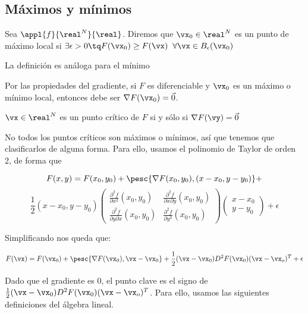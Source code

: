 \documentclass[12pt,a4paper,titlepage]{apuntes}
\begin{document}
\subsection{Máximos y mínimos}

\begin{defn} Sea $\appl{f}{\real^N}{\real}$. Diremos que $\vx_0 \in \real^N$ es un punto de máximo local si $\exists \epsilon > 0 \tq F(\vx_0) \geq F(\vx)\;\; \forall \vx \in B_{\epsilon} (\vx_0) $

La definición es análoga para el mínimo\end{defn}

\begin{remark} Por las propiedades del gradiente, si $F$ es diferenciable y $\vx_0$ es un máximo o mínimo local, entonces debe ser $\nabla F(\vx_0) = \vec{0}$.\end{remark}

\begin{defn} $\vx \in \real^N$ es un punto crítico de $F$ si y sólo si $\nabla F(\vy) = \vec{0}$\end{defn}

No todos los puntos críticos son máximos o mínimos, así que tenemos que clasificarlos de alguna forma. Para ello, usamos el polinomio de Taylor de orden 2, de forma que 

\[F(x,y) = F(x_0, y_0) + \pesc{\nabla F(x_0, y_0), (x-x_0, y-y_0)} +\]\[\frac{1}{2}(x-x_0, y-y_0)\left(\begin{matrix} \frac{\partial^2 f}{∂ x^2} (x_0,y_0) & \frac{\partial^2 f}{\partial x \partial y} (x_0,y_0) 
\\ \frac{\partial^2 f}{\partial y \partial x} (x_0,y_0) & \frac{\partial^2 f}{\partial y^2} (x_0,y_0) \end{matrix}\right) \left(\begin{matrix} x - x_0 \\ y - y_0 \end{matrix}\right) + \epsilon \]

Simplificando nos queda que:

\[F(\vx) = F(\vx_0) + \pesc{\nabla F(\vx_0),\vx - \vx_0} + \frac{1}{2}(\vx - \vx_0) D^2F(\vx_0) (\vx - \vx_o) ^T + \epsilon\]

Dado que el gradiente es 0, el punto clave es el signo de $\frac{1}{2}(\vx - \vx_0) D^2F(\vx_0) (\vx - \vx_o) ^T$. Para ello, usamos las siguientes definiciones del álgebra lineal.
\end{document}
